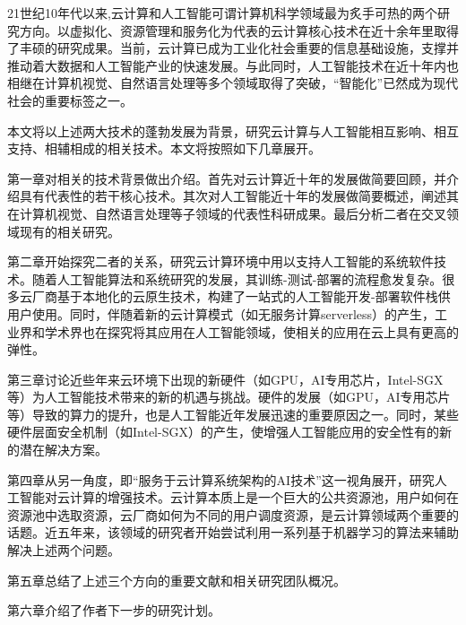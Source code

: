 
\begin{cabstract}
	21世纪10年代以来,云计算和人工智能可谓计算机科学领域最为炙手可热的两个研究方向。以虚拟化、资源管理和服务化为代表的云计算核心技术在近十余年里取得了丰硕的研究成果。当前，云计算已成为工业化社会重要的信息基础设施，支撑并推动着大数据和人工智能产业的快速发展。与此同时，人工智能技术在近十年内也相继在计算机视觉、自然语言处理等多个领域取得了突破，“智能化”已然成为现代社会的重要标签之一。
	
	本文将以上述两大技术的蓬勃发展为背景，研究云计算与人工智能相互影响、相互支持、相辅相成的相关技术。本文将按照如下几章展开。
	
	第一章对相关的技术背景做出介绍。首先对云计算近十年的发展做简要回顾，并介绍具有代表性的若干核心技术。其次对人工智能近十年的发展做简要概述，阐述其在计算机视觉、自然语言处理等子领域的代表性科研成果。最后分析二者在交叉领域现有的相关研究。
	
	第二章开始探究二者的关系，研究云计算环境中用以支持人工智能的系统软件技术。随着人工智能算法和系统研究的发展，其训练-测试-部署的流程愈发复杂。很多云厂商基于本地化的云原生技术，构建了一站式的人工智能开发-部署软件栈供用户使用。同时，伴随着新的云计算模式（如无服务计算serverless）的产生，工业界和学术界也在探究将其应用在人工智能领域，使相关的应用在云上具有更高的弹性。

	第三章讨论近些年来云环境下出现的新硬件（如GPU，AI专用芯片，Intel-SGX等）为人工智能技术带来的新的机遇与挑战。硬件的发展（如GPU，AI专用芯片等）导致的算力的提升，也是人工智能近年发展迅速的重要原因之一。同时，某些硬件层面安全机制（如Intel-SGX）的产生，使增强人工智能应用的安全性有的新的潜在解决方案。

	第四章从另一角度，即“服务于云计算系统架构的AI技术”这一视角展开，研究人工智能对云计算的增强技术。云计算本质上是一个巨大的公共资源池，用户如何在资源池中选取资源，云厂商如何为不同的用户调度资源，是云计算领域两个重要的话题。近五年来，该领域的研究者开始尝试利用一系列基于机器学习的算法来辅助解决上述两个问题。
	
	第五章总结了上述三个方向的重要文献和相关研究团队概况。
	
	第六章介绍了作者下一步的研究计划。

\end{cabstract}


